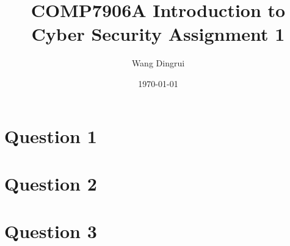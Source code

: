 \documentclass{article}
\title{COMP7906A Introduction to Cyber Security Assignment 1}
\author{Wang Dingrui}
\date{\today}
\begin{document}
\maketitle

\section{Question 1}

\section{Question 2}

\section{Question 3}

\end{document}
